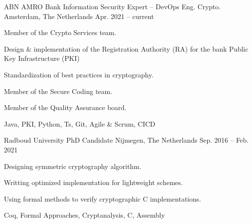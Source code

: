 

\begin{cventries}

	\cventrysix%
	{ABN AMRO Bank} %
	{Information Security Expert -- DevOps Eng. Crypto.} %
	{Amsterdam, The Netherlands} %
	{Apr. 2021 -- current} %
	{
		\begin{cvitems} %
			\item {Member of the Crypto Services team.}
			\item {Design \& implementation of the Registration Authority (RA) for the bank Public Key Infrastructure (PKI)} %
			\item {Standardization of best practices in cryptography.}
			\item {Member of the Secure Coding team.}
			\item {Member of the Quality Assurance board.}
		\end{cvitems}
	}%
	{Java, PKI, Python, Ts, Git, Agile \& Scrum, CICD}%


	\cventrysix%
	{Radboud University} %
	{PhD Candidate} %
	{Nijmegen, The Netherlands} %
	{Sep. 2016 -- Feb. 2021} %
	{
		\begin{cvitems} %
			\item {Designing symmetric cryptography algorithm.} %
			\item {Writting optimized implementation for lightweight schemes.} %
			\item {Using formal methods to verify cryptographic C implementations.} %
		\end{cvitems}
	}%
	{Coq, Formal Approaches, Cryptanalysis, C, Assembly}%



\end{cventries}
